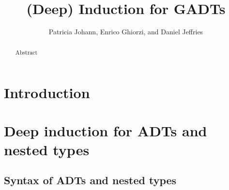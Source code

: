 \documentclass[acmsmall,screen,review,anonymous]{acmart}
\title[(Deep) Induction for GADTs]{(Deep) Induction for GADTs}
\author{Patricia Johann, Enrico Ghiorzi, and Daniel Jeffries}
\affiliation{ \institution{Appalachian State University}}
\theoremstyle{definition}
\begin{document}
\begin{abstract}
Abstract
\end{abstract}

\maketitle

\section{Introduction}\label{sec:intro}



\section{Deep induction for ADTs and nested types}


\subsection{Syntax of ADTs and nested types}\label{ssec:syntax-adts}
\end{document}
